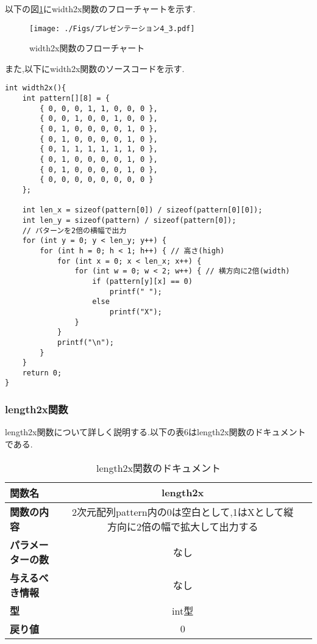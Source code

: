 \documentclass[uplatex,dvipdfmx]{jsarticle}
\begin{document}
以下の図\ref{fig:width2x関数のフローチャート}にwidth2x関数のフローチャートを示す.
\begin{figure}[h]
    \centering
    \texttt{[image: ./Figs/プレゼンテーション4\_3.pdf]}
    \caption{width2x関数のフローチャート}
    \label{fig:width2x関数のフローチャート}
\end{figure}

また,以下にwidth2x関数のソースコードを示す.
\begin{lstlisting}[firstnumber = 1, caption=横２倍の大きさで表示する, label=code]   
int width2x(){
    int pattern[][8] = {
        { 0, 0, 0, 1, 1, 0, 0, 0 },
        { 0, 0, 1, 0, 0, 1, 0, 0 },
        { 0, 1, 0, 0, 0, 0, 1, 0 },
        { 0, 1, 0, 0, 0, 0, 1, 0 },
        { 0, 1, 1, 1, 1, 1, 1, 0 },
        { 0, 1, 0, 0, 0, 0, 1, 0 },
        { 0, 1, 0, 0, 0, 0, 1, 0 },
        { 0, 0, 0, 0, 0, 0, 0, 0 }
    };
        
    int len_x = sizeof(pattern[0]) / sizeof(pattern[0][0]);
    int len_y = sizeof(pattern) / sizeof(pattern[0]);
    // パターンを2倍の横幅で出力
    for (int y = 0; y < len_y; y++) {
        for (int h = 0; h < 1; h++) { // 高さ(high)
            for (int x = 0; x < len_x; x++) {
                for (int w = 0; w < 2; w++) { // 横方向に2倍(width)
                    if (pattern[y][x] == 0) 
                        printf(" ");
                    else
                        printf("X");
                }
            }
            printf("\n");
        }
    }
    return 0;
}
\end{lstlisting}

\subsubsection{length2x関数}
length2x関数について詳しく説明する.以下の表6はlength2x関数のドキュメントである.

\begin{table}[h]
    \centering
    \caption{length2x関数のドキュメント}
    \begin{tabular}{@{}lcc@{}}
    \toprule
    \textbf{関数名}         & \textbf{length2x}                                        \\ \midrule
    \textbf{関数の内容}                & 2次元配列pattern内の0は空白として,1はXとして縦方向に2倍の幅で拡大して出力する   \\ 
    \textbf{パラメーターの数}               &     なし                                \\ 
    \textbf{与えるべき情報}             &     なし                        \\ 
    \textbf{型}                &     int型                    \\ 
    \textbf{戻り値}                & 0                              \\ \bottomrule
  \end{tabular}
\end{table}
\end{document}
